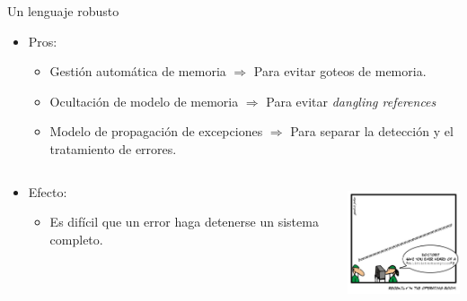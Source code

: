 \begin{frame}[t]{Un lenguaje robusto}
  \begin{itemize}
    \item Pros:
      \begin{itemize}
        \item Gestión automática de memoria $\Rightarrow$ Para evitar goteos de memoria.
        \item Ocultación de modelo de memoria $\Rightarrow$ Para evitar \emph{dangling references}
        \item Modelo de propagación de excepciones $\Rightarrow$ Para separar la detección y el tratamiento de errores.
      \end{itemize}
  \end{itemize}
  \pause
  \begin{columns}[t]
    \begin{column}[T]{0.5\textwidth}
      \begin{itemize}
        \item Efecto:
          \begin{itemize}
            \item Es difícil que un error haga detenerse un sistema completo.
          \end{itemize}
      \end{itemize}
    \end{column}
    \begin{column}[T]{0.5\textwidth}
      \includegraphics[height=3.5cm]{images/null-pointer-exception.png}
    \end{column}
  \end{columns}

\end{frame}

